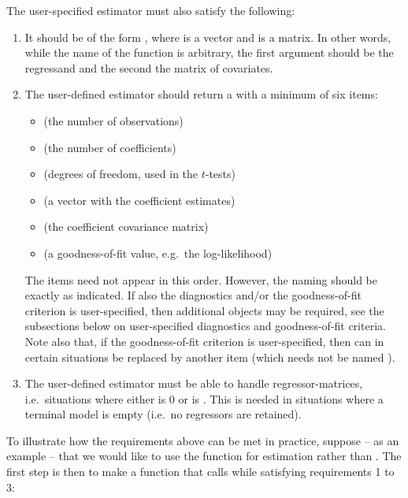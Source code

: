 The user-specified estimator must also satisfy the following:
%
\begin{enumerate}
	\item It should be of the form , where  is a vector and  is a matrix. In other words, while the name of the function is arbitrary, the first argument should be the regressand and the second the matrix of covariates.
	
	\item The user-defined estimator should return a  with a minimum of six items:
	\begin{itemize}
		\item {} (the number of observations)
		\item {} (the number of coefficients)
		\item {} (degrees of freedom, used in the $t$-tests)
		\item {} (a vector with the coefficient estimates)
		\item {} (the coefficient covariance matrix)
		\item {} (a goodness-of-fit value, e.g.\ the log-likelihood)
	\end{itemize}
	The items need not appear in this order. However, the naming should be exactly as indicated. If also the diagnostics and/or the goodness-of-fit criterion is user-specified, then additional objects may be required, see the subsections below on user-specified diagnostics and goodness-of-fit criteria. Note also that, if the goodness-of-fit criterion is user-specified, then  can in certain situations be replaced by another item (which needs not be named ). 
	
	\item The user-defined estimator must be able to handle  regressor-matrices, i.e.\ situations where either  is 0 or  is . This is needed in situations where a terminal model is empty (i.e.\ no regressors are retained).
\end{enumerate}
%
To illustrate how the requirements above can be met in practice, suppose -- as an example -- that we would like to use the function  for estimation rather than . The first step is then to make a function that calls  while satisfying requirements 1 to 3:
%
